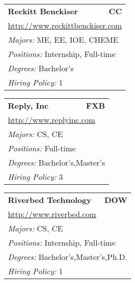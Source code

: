 \documentclass[twoside]{article}
\begin{document}
\begin{center}
\begin{multicols}{3}
\begin{FlushLeft}
\begin{minipage}{\columnwidth}
\end{minipage}
 
\begin{minipage}{\columnwidth}\begin{tabularx}{.95\columnwidth}{Xr}
                 {\Large\bf Reckitt Benckiser} & {\Large\bf CC}\\
    \multicolumn{2}{p{.95\columnwidth}}{\url{http://www.reckittbenckiser.com}}\\
    \multicolumn{2}{p{.95\columnwidth}}{\emph{Majors:} ME, EE, IOE, CHEME}\\
    \multicolumn{2}{p{.95\columnwidth}}{\emph{Positions:} Internship, Full-time}\\
    \multicolumn{2}{p{.95\columnwidth}}{\emph{Degrees:} Bachelor's}\\
    \multicolumn{2}{p{.95\columnwidth}}{\emph{Hiring Policy:} 1}\\
    \end{tabularx}
    
\end{minipage}
 
\begin{minipage}{\columnwidth}\begin{tabularx}{.95\columnwidth}{Xr}
                 {\Large\bf Reply, Inc} & {\Large\bf FXB}\\
    \multicolumn{2}{p{.95\columnwidth}}{\url{http://www.replyinc.com}}\\
    \multicolumn{2}{p{.95\columnwidth}}{\emph{Majors:} CS, CE}\\
    \multicolumn{2}{p{.95\columnwidth}}{\emph{Positions:} Full-time}\\
    \multicolumn{2}{p{.95\columnwidth}}{\emph{Degrees:} Bachelor's,Master's}\\
    \multicolumn{2}{p{.95\columnwidth}}{\emph{Hiring Policy:} 3}\\
    \end{tabularx}
    
\end{minipage}
 
\begin{minipage}{\columnwidth}\begin{tabularx}{.95\columnwidth}{Xr}
                 {\Large\bf Riverbed Technology} & {\Large\bf DOW}\\
    \multicolumn{2}{p{.95\columnwidth}}{\url{http://www.riverbed.com}}\\
    \multicolumn{2}{p{.95\columnwidth}}{\emph{Majors:} CS, CE}\\
    \multicolumn{2}{p{.95\columnwidth}}{\emph{Positions:} Internship, Full-time}\\
    \multicolumn{2}{p{.95\columnwidth}}{\emph{Degrees:} Bachelor's,Master's,Ph.D.}\\
    \multicolumn{2}{p{.95\columnwidth}}{\emph{Hiring Policy:} 1}\\
    \end{tabularx}
    

\end{minipage}
\end{FlushLeft}
\end{multicols}
\end{center}
\end{document}
